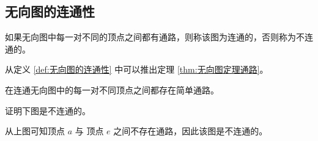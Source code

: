 \begin{collections}
\begin{solution}
\begin{center}
            \hspace{3em}
        \end{center}
    \end{solution}
\end{collections}

\subsection{无向图的连通性}
\begin{definition}[无向图的连通性]\label{def:无向图的连通性}
    如果无向图中每一对不同的顶点之间都有通路，则称该图为连通的，否则称为不连通的。
\end{definition}

从定义 \ref{def:无向图的连通性} 中可以推出定理 \ref{thm:无向图定理通路}。

\begin{theorem}\label{thm:无向图定理通路}
    在连通无向图中的每一对不同顶点之间都存在简单通路。
\end{theorem}

\begin{collections}
    \begin{example}
        证明下图是不连通的。
        \begin{center}
        \end{center}
    \end{example}
    \begin{solution}
        从上图可知顶点 $a$ 与 顶点 $e$ 之间不存在通路，因此该图是不连通的。
    \end{solution}
\end{collections}

